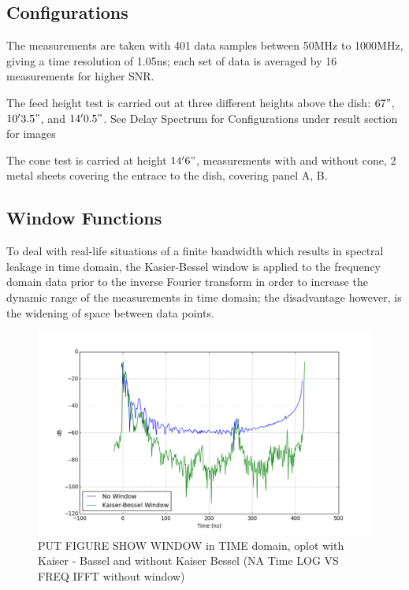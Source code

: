 \documentclass[preprint]{aastex}  %
\begin{document}
\subsection{Configurations}
The measurements are taken with 401 data samples between 50MHz to 1000MHz, giving a time resolution of 1.05ns; each set of data is averaged by 16 measurements for higher SNR. 

The feed height test is carried out at three different heights above the dish: $67"$, $10'3.5"$, and $14'0.5"$.
See Delay Spectrum for Configurations under result section for images


The cone test is carried at height $14' 6"$, measurements with and without cone, 2 metal sheets covering the entrace to the dish, covering panel A, B.


\subsection{Window Functions}
To deal with real-life situations of a finite bandwidth which results in spectral leakage in time domain,  the Kasier-Bessel window is applied to the frequency domain data prior to the inverse Fourier transform in order to increase the dynamic range of the measurements in time domain; the disadvantage however, is the widening of space between data points.


\begin{figure}[H]
	\begin{center}
	\includegraphics[width =\textwidth]{./reflectometry_plots/windowfunction}
	\caption{PUT FIGURE SHOW WINDOW in TIME domain, oplot with Kaiser - Bassel and without Kaiser Bessel (NA Time LOG VS FREQ IFFT without window)
\label{Fig:window}}
	\end{center}
\end{figure}
\end{document}
